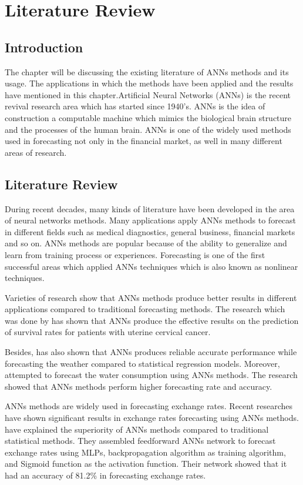 \chapter{Literature Review}
\section{Introduction}
The chapter will be discussing the existing literature of ANNs methods and its usage. The applications in which the methods have been applied and the results have mentioned in this chapter.Artificial Neural Networks (ANNs) is the recent revival research area which has started since 1940's. ANNs is the idea of construction  a computable machine which mimics the biological brain structure and the processes of the human brain. ANNs is one of the widely used methods used  in forecasting not only in the financial market, as well in many different areas of research.

\section{Literature Review}

During recent decades, many kinds of literature have been developed in the area of neural networks methods. Many applications apply ANNs methods  to forecast in different fields such as medical diagnostics, general business, financial markets and so on. ANNs methods  are popular because of the ability to generalize and learn from training process or experiences. Forecasting is one of the first successful areas which applied ANNs techniques which is also known as nonlinear techniques.  

Varieties of research show that ANNs methods  produce better results in different applications compared to traditional forecasting methods. The  research which was done by   has shown that  ANNs produce the effective  results on  the prediction of survival rates for patients with uterine cervical cancer. 

Besides,  has also shown that ANNs produces reliable accurate performance while forecasting the weather compared to statistical regression models. Moreover,  attempted to forecast the water consumption using ANNs methods. The research showed that ANNs methods perform higher forecasting rate and accuracy.

ANNs methods are widely used in forecasting exchange rates. Recent researches have shown  significant results in exchange rates forecasting using ANNs methods. have explained the superiority of ANNs methods  compared to traditional statistical methods. They assembled feedforward ANNs network to forecast exchange rates  using MLPs, backpropagation algorithm as training algorithm, and Sigmoid function as the activation function. Their network showed that  it had an accuracy of 81.2\% in forecasting exchange rates.

